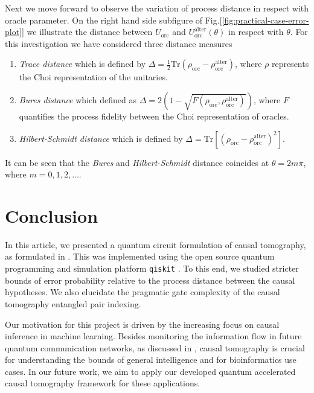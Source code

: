 \documentclass[%
 aps,
 jmp,%
 amsmath,amssymb,
 reprint,%
]{revtex4-2}
\begin{document}
Next we move forward to observe the variation of process distance in respect with oracle parameter. On the right hand side subfigure of Fig.[\ref{fig:practical-case-error-plot}] we illustrate the distance between $U_\textrm{orc}$ and $U_\textrm{orc}^\textrm{alter}(\theta)$ in respect with $\theta$. For this investigation we have considered three distance measures
\begin{enumerate}%
	\item \textit{Trace distance} which is defined by $\Delta = \frac{1}{2}\textrm{Tr}\left(\rho_\textrm{orc}-\rho_\textrm{orc}^\textrm{alter}\right)$, where $\rho$ represents the Choi representation of the unitaries.
	\item \textit{Bures distance} which defined as $\Delta = 2\left(1-\sqrt{F(\rho_\textrm{orc},\rho_\textrm{orc}^\textrm{alter})}\right)$, where $F$ quantifies the process fidelity between the Choi representation of oracles.
	\item \textit{Hilbert-Schmidt distance} which is defined by $\Delta = \textrm{Tr}\left[\left(\rho_\textrm{orc} - \rho_\textrm{orc}^\textrm{alter}\right)^2\right]$.
\end{enumerate}
It can be seen that the \textit{Bures} and \textit{Hilbert-Schmidt} distance coincides at $\theta=2m\pi$, where $m=0,1,2,\ldots$. 

\section{Conclusion} \label{sec:conclusion}

In this article, we presented a quantum circuit formulation of causal tomography, as formulated in \cite{chiribella2019quantum}.
This was implemented using the open source quantum programming and simulation platform \texttt{qiskit} .
To this end, we studied stricter bounds of error probability relative to the process distance between the causal hypotheses.
We also elucidate the pragmatic gate complexity of the causal tomography entangled pair indexing.

Our motivation for this project is driven by the increasing focus on causal inference in machine learning.
Besides monitoring the information flow in future quantum communication networks, as discussed in \cite{chiribella2019quantum}, causal tomography is crucial for understanding the bounds of general intelligence and for bioinformatics use cases.
In our future work, we aim to apply our developed quantum accelerated causal tomography framework for these applications.
\end{document}
